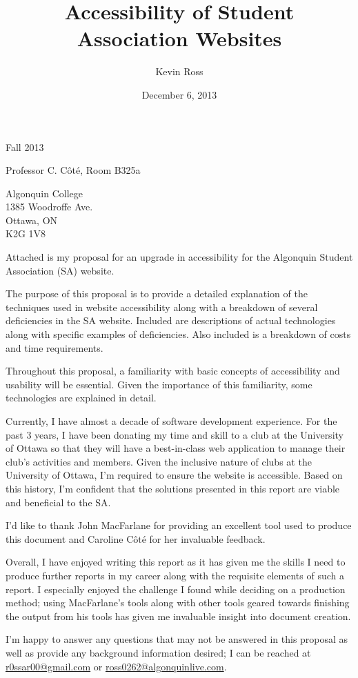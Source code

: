 \documentclass[]{article}
\title{Accessibility of Student Association Websites}
\author{Kevin Ross}
\date{December 6, 2013}
\begin{document}
 Fall 2013

Professor C. Côté, Room B325a

Algonquin College\\1385 Woodroffe Ave.\\Ottawa, ON\\K2G 1V8

Attached is my proposal for an upgrade in accessibility for the
Algonquin Student Association (SA) website.

The purpose of this proposal is to provide a detailed explanation of the
techniques used in website accessibility along with a breakdown of
several deficiencies in the SA website. Included are descriptions of
actual technologies along with specific examples of deficiencies. Also
included is a breakdown of costs and time requirements.

Throughout this proposal, a familiarity with basic concepts of
accessibility and usability will be essential. Given the importance of
this familiarity, some technologies are explained in detail.

Currently, I have almost a decade of software development experience.
For the past 3 years, I have been donating my time and skill to a club
at the University of Ottawa so that they will have a best-in-class web
application to manage their club's activities and members. Given the
inclusive nature of clubs at the University of Ottawa, I'm required to
ensure the website is accessible. Based on this history, I'm confident
that the solutions presented in this report are viable and beneficial to
the SA.

I'd like to thank John MacFarlane for providing an excellent tool used
to produce this document and Caroline Côté for her invaluable feedback.

Overall, I have enjoyed writing this report as it has given me the
skills I need to produce further reports in my career along with the
requisite elements of such a report. I especially enjoyed the challenge
I found while deciding on a production method; using MacFarlane's tools
along with other tools geared towards finishing the output from his
tools has given me invaluable insight into document creation.

I'm happy to answer any questions that may not be answered in this
proposal as well as provide any background information desired; I can be
reached at \href{mailto:r0ssar00@gmail.com}{r0ssar00@gmail.com} or
\href{mailto:ross0262@algonquinlive.com}{ross0262@algonquinlive.com}.
\end{document}
